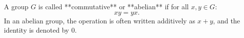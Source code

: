 A group $G$ is called **commutative** or **abelian** if for all $x, y \in G$:
$$xy = yx.$$
In an abelian group, the operation is often written additively as $x + y$, and the identity is denoted by $0$.
